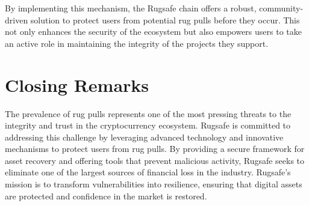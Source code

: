 \documentclass{article}
\begin{document}
By implementing this mechanism, the Rugsafe chain offers a robust, community-driven solution to protect users from potential rug pulls before they occur. This not only enhances the security of the ecosystem but also empowers users to take an active role in maintaining the integrity of the projects they support.















\section{Closing Remarks}
The prevalence of rug pulls represents one of the most pressing threats to the integrity and trust in the cryptocurrency ecosystem. Rugsafe is committed to addressing this challenge by leveraging advanced technology and innovative mechanisms to protect users from rug pulls. By providing a secure framework for asset recovery and offering tools that prevent malicious activity, Rugsafe seeks to eliminate one of the largest sources of financial loss in the industry. Rugsafe’s mission is to transform vulnerabilities into resilience, ensuring that digital assets are protected and confidence in the market is restored.
\end{document}
